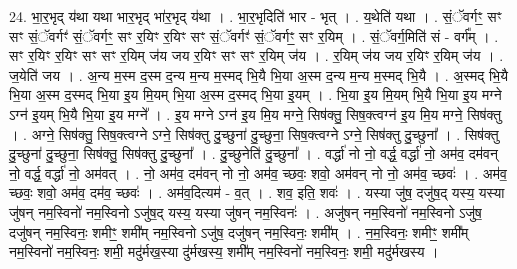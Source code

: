 \documentclass[17pt]{extarticle}
\begin{document}
24. भा॒र॒भृद् य॑था यथा भार॒भृद् भा॑र॒भृद् य॑था । . भा॒र॒भृदिति॑ भार - भृत् । . य॒थेति॑ यथा । . सं॒ॅवर्गꣳ॒॒ सꣳ सꣳ सं॒ॅवर्गꣳ॑ सं॒ॅवर्गꣳ॒॒ सꣳ र॒यिꣳ र॒यिꣳ सꣳ सं॒ॅवर्गꣳ॑ सं॒ॅवर्गꣳ॒॒ सꣳ र॒यिम् । . सं॒ॅवर्ग॒मिति॑ सं - वर्ग᳚म् । . सꣳ र॒यिꣳ र॒यिꣳ सꣳ सꣳ र॒यिम् ज॑य जय र॒यिꣳ सꣳ सꣳ र॒यिम् ज॑य । . र॒यिम् ज॑य जय र॒यिꣳ र॒यिम् ज॑य । . ज॒येति॑ जय । . अ॒न्य म॒स्म द॒स्म द॒न्य म॒न्य म॒स्मद् भि॒यै भि॒या अ॒स्म द॒न्य म॒न्य म॒स्मद् भि॒यै । . अ॒स्मद् भि॒यै भि॒या अ॒स्म द॒स्मद् भि॒या इ॒य मि॒यम् भि॒या अ॒स्म द॒स्मद् भि॒या इ॒यम् । . भि॒या इ॒य मि॒यम् भि॒यै भि॒या इ॒य मग्ने ऽग्न॑ इ॒यम् भि॒यै भि॒या इ॒य मग्ने᳚ । . इ॒य मग्ने ऽग्न॑ इ॒य मि॒य मग्ने॒ सिष॑क्तु॒ सिष॒क्त्वग्न॑ इ॒य मि॒य मग्ने॒ सिष॑क्तु । . अग्ने॒ सिष॑क्तु॒ सिष॒क्त्वग्ने ऽग्ने॒ सिष॑क्तु दु॒च्छुना॑ दु॒च्छुना॒ सिष॒क्त्वग्ने ऽग्ने॒ सिष॑क्तु दु॒च्छुना᳚ । . सिष॑क्तु दु॒च्छुना॑ दु॒च्छुना॒ सिष॑क्तु॒ सिष॑क्तु दु॒च्छुना᳚ । . दु॒च्छुनेति॑ दु॒च्छुना᳚ । . वर्द्धा॑ नो नो॒ वर्द्ध॒ वर्द्धा॑ नो॒ अम॑व॒ दम॑वन् नो॒ वर्द्ध॒ वर्द्धा॑ नो॒ अम॑वत् । . नो॒ अम॑व॒ दम॑वन् नो नो॒ अम॑व॒ च्छवः॒ शवो॒ अम॑वन् नो नो॒ अम॑व॒ च्छवः॑ । . अम॑व॒ च्छवः॒ शवो॒ अम॑व॒ दम॑व॒ च्छवः॑ । . अम॑व॒दित्यम॑ - व॒त् । . शव॒ इति॒ शवः॑ । . यस्या जु॑ष॒ दजु॑ष॒द् यस्य॒ यस्या जु॑षन् नम॒स्विनो॑ नम॒स्विनो ऽजु॑ष॒द् यस्य॒ यस्या जु॑षन् नम॒स्विनः॑ । . अजु॑षन् नम॒स्विनो॑ नम॒स्विनो ऽजु॑ष॒ दजु॑षन् नम॒स्विनः॒ शमीꣳ॒॒ शमी᳚म् नम॒स्विनो ऽजु॑ष॒ दजु॑षन् नम॒स्विनः॒ शमी᳚म् । . न॒म॒स्विनः॒ शमीꣳ॒॒ शमी᳚म् नम॒स्विनो॑ नम॒स्विनः॒ शमी॒ मदु॑र्मख॒स्या दु॑र्मखस्य॒ शमी᳚म् नम॒स्विनो॑ नम॒स्विनः॒ शमी॒ मदु॑र्मखस्य । \newline
\end{document}
